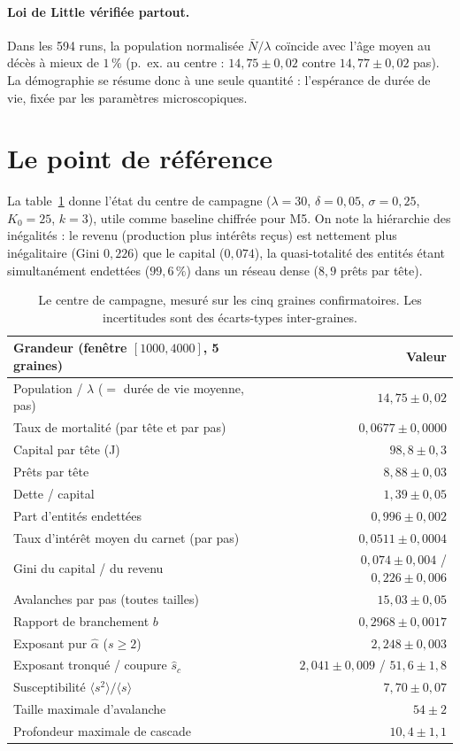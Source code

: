 \documentclass[11pt,a4paper]{article}
\begin{document}
\paragraph{Loi de Little vérifiée partout.} Dans les 594 runs, la
population normalisée $\bar N/\lambda$ coïncide avec l'âge moyen au
décès à mieux de $1\,\%$ (p.~ex. au centre : $14{,}75\pm0{,}02$ contre
$14{,}77\pm0{,}02$ pas). La démographie se résume donc à une seule
quantité : l'espérance de durée de vie, fixée par les paramètres
microscopiques.

\section{Le point de référence}
\label{sec:reference}

La table~\ref{tab:centre} donne l'état du centre de campagne
($\lambda=30$, $\delta=0{,}05$, $\sigma=0{,}25$, $K_0=25$, $k=3$),
utile comme baseline chiffrée pour M5. On note la hiérarchie des
inégalités : le revenu (production plus intérêts reçus) est nettement
plus inégalitaire (Gini $0{,}226$) que le capital ($0{,}074$), la
quasi-totalité des entités étant simultanément endettées
($99{,}6\,\%$) dans un réseau dense ($8{,}9$ prêts par tête).

\begin{table}[tbh]
\centering
\begin{tabular}{@{}lr@{}}
\toprule
Grandeur (fenêtre $[1000,4000]$, 5 graines) & Valeur \\
\midrule
Population / $\lambda$ ($=$ durée de vie moyenne, pas) & $14{,}75\pm0{,}02$ \\
Taux de mortalité (par tête et par pas) & $0{,}0677\pm0{,}0000$ \\
Capital par tête (J) & $98{,}8\pm0{,}3$ \\
Prêts par tête & $8{,}88\pm0{,}03$ \\
Dette / capital & $1{,}39\pm0{,}05$ \\
Part d'entités endettées & $0{,}996\pm0{,}002$ \\
Taux d'intérêt moyen du carnet (par pas) & $0{,}0511\pm0{,}0004$ \\
Gini du capital / du revenu & $0{,}074\pm0{,}004$ / $0{,}226\pm0{,}006$ \\
Avalanches par pas (toutes tailles) & $15{,}03\pm0{,}05$ \\
Rapport de branchement $b$ & $0{,}2968\pm0{,}0017$ \\
Exposant pur $\hat\alpha$ ($s\ge2$) & $2{,}248\pm0{,}003$ \\
Exposant tronqué / coupure $\hat s_c$ & $2{,}041\pm0{,}009$ / $51{,}6\pm1{,}8$ \\
Susceptibilité $\langle s^2\rangle/\langle s\rangle$ & $7{,}70\pm0{,}07$ \\
Taille maximale d'avalanche & $54\pm2$ \\
Profondeur maximale de cascade & $10{,}4\pm1{,}1$ \\
\bottomrule
\end{tabular}
\caption{Le centre de campagne, mesuré sur les cinq graines
confirmatoires. Les incertitudes sont des écarts-types inter-graines.}
\label{tab:centre}
\end{table}
\end{document}
